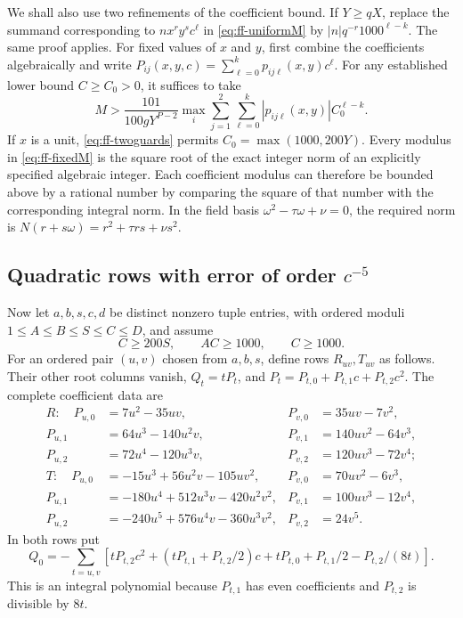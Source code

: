 \documentclass[12pt]{article}
\numberwithin{equation}{section}
\begin{document}
We shall also use two refinements of the coefficient bound. If $Y\ge qX$, replace the summand corresponding to
$n x^ry^sc^\ell$ in \eqref{eq:ff-uniformM} by
$|n|q^{-r}1000^{\ell-k}$. The same proof applies.
For fixed values of $x$ and $y$, first combine the coefficients algebraically and
write
$P_{ij}(x,y,c)=\sum_{\ell=0}^kp_{ij\ell}(x,y)c^\ell$.
For any established lower bound $C\ge C_0>0$, it suffices to take
\begin{equation}\label{eq:ff-fixedM}
 M>\frac{101}{100gY^{P-2}}
       \max_i\sum_{j=1}^2\sum_{\ell=0}^k
                    |p_{ij\ell}(x,y)|C_0^{\ell-k}.
\end{equation}
If $x$ is a unit, \eqref{eq:ff-twoguards} permits
$C_0=\max(1000,200Y)$.
Every modulus in \eqref{eq:ff-fixedM} is the square root of the exact
integer norm of an explicitly specified algebraic integer. Each coefficient modulus can therefore be bounded above by a rational number by comparing the square of that number with the corresponding integral norm. In the field basis $\omega^2-\tau\omega+\nu=0$, the required norm
is $N(r+s\omega)=r^2+\tau rs+\nu s^2$.

\subsection[Quadratic rows and their error bounds]{Quadratic rows with error of order $c^{-5}$}

Now let $a,b,s,c,d$ be distinct nonzero tuple entries, with ordered
moduli $1\le A\le B\le S\le C\le D$, and assume
\begin{equation}\label{eq:ff-pguards}
 C\ge200S,\qquad AC\ge1000,\qquad C\ge1000.
\end{equation}
For an ordered pair $(u,v)$ chosen from $a,b,s$, define rows $R_{uv},T_{uv}$ as follows. Their other root columns vanish, $Q_t=tP_t$, and
$P_t=P_{t,0}+P_{t,1}c+P_{t,2}c^2$. The complete coefficient data are
\begin{align*}
 R:\quad P_{u,0}&=7u^2-35uv,&P_{v,0}&=35uv-7v^2,\\
 P_{u,1}&=64u^3-140u^2v,&P_{v,1}&=140uv^2-64v^3,\\
 P_{u,2}&=72u^4-120u^3v,&P_{v,2}&=120uv^3-72v^4;\\[2mm]
 T:\quad P_{u,0}&=-15u^3+56u^2v-105uv^2,&
 P_{v,0}&=70uv^2-6v^3,\\
 P_{u,1}&=-180u^4+512u^3v-420u^2v^2,&
 P_{v,1}&=100uv^3-12v^4,\\
 P_{u,2}&=-240u^5+576u^4v-360u^3v^2,&
 P_{v,2}&=24v^5.
\end{align*}
In both rows put
\begin{equation}\label{eq:ff-pzero}
 Q_0=-\sum_{t=u,v}\left[
 tP_{t,2}c^2+(tP_{t,1}+P_{t,2}/2)c
              +tP_{t,0}+P_{t,1}/2-P_{t,2}/(8t)\right].
\end{equation}
This is an integral polynomial because $P_{t,1}$ has even coefficients and
$P_{t,2}$ is divisible by $8t$.
\end{document}
